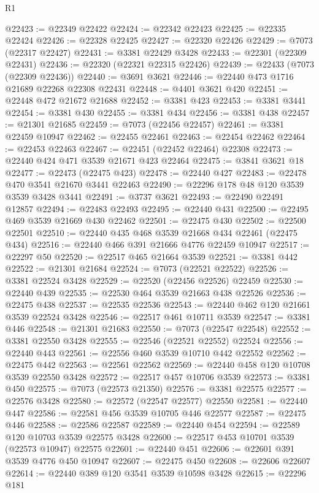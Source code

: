 \begin{lexlean}{R1}
\begin{coremodule}
@22423 := @22349 @22422
@22424 := @22342 @22423
@22425 := @22335 @22424
@22426 := @22328 @22425
@22427 := @22320 @22426
@22429 := @7073 (@22317 @22427)
@22431 := @3381 @22429 @3428
@22433 := @22301 (@22309 @22431)
@22436 := @22320 (@22321 @22315 @22426)
@22439 := @22433 (@7073 (@22309 @22436))
@22440 := @3691 @3621
@22446 := @22440 @473 @1716 @21689 @22268 @22308 @22431
@22448 := @4401 @3621 @420
@22451 := @22448 @472 @21672 @21688
@22452 := @3381 @423
@22453 := @3381 @3441
@22454 := @3381 @430
@22455 := @3381 @434
@22456 := @3381 @438
@22457 := @21301 @21685
@22459 := @7073 (@22456 @22457)
@22461 := @3381 @22459 @10947
@22462 := @22455 @22461
@22463 := @22454 @22462
@22464 := @22453 @22463
@22467 := @22451 (@22452 @22464) @22308
@22473 := @22440 @424 @471 @3539 @21671 @423 @22464
@22475 := @3841 @3621 @18
@22477 := @22473 (@22475 @423)
@22478 := @22440 @427
@22483 := @22478 @470 @3541 @21670 @3441 @22463
@22490 := @22296 @178 @48 @120 @3539 @3539 @3428 @3441
@22491 := @3737 @3621
@22493 := @22490 @22491 @12857
@22494 := @22483 @22493
@22495 := @22440 @431
@22500 := @22495 @469 @3539 @21669 @430 @22462
@22501 := @22475 @430
@22502 := @22500 @22501
@22510 := @22440 @435 @468 @3539 @21668 @434 @22461 (@22475 @434)
@22516 := @22440 @466 @391 @21666 @4776 @22459 @10947
@22517 := @22297 @50
@22520 := @22517 @465 @21664 @3539
@22521 := @3381 @442
@22522 := @21301 @21684
@22524 := @7073 (@22521 @22522)
@22526 := @3381 @22524 @3428
@22529 := @22520 (@22456 @22526) @22459
@22530 := @22440 @439
@22535 := @22530 @464 @3539 @21663 @438 @22526
@22536 := @22475 @438
@22537 := @22535 @22536
@22543 := @22440 @462 @120 @21661 @3539 @22524 @3428
@22546 := @22517 @461 @10711 @3539
@22547 := @3381 @446
@22548 := @21301 @21683
@22550 := @7073 (@22547 @22548)
@22552 := @3381 @22550 @3428
@22555 := @22546 (@22521 @22552) @22524
@22556 := @22440 @443
@22561 := @22556 @460 @3539 @10710 @442 @22552
@22562 := @22475 @442
@22563 := @22561 @22562
@22569 := @22440 @458 @120 @10708 @3539 @22550 @3428
@22572 := @22517 @457 @10706 @3539
@22573 := @3381 @450
@22575 := @7073 (@22573 @21350)
@22576 := @3381 @22575
@22577 := @22576 @3428
@22580 := @22572 (@22547 @22577) @22550
@22581 := @22440 @447
@22586 := @22581 @456 @3539 @10705 @446 @22577
@22587 := @22475 @446
@22588 := @22586 @22587
@22589 := @22440 @454
@22594 := @22589 @120 @10703 @3539 @22575 @3428
@22600 := @22517 @453 @10701 @3539 (@22573 @10947) @22575
@22601 := @22440 @451
@22606 := @22601 @391 @3539 @4776 @450 @10947
@22607 := @22475 @450
@22608 := @22606 @22607
@22614 := @22440 @389 @120 @3541 @3539 @10598 @3428
@22615 := @22296 @181

\end{coremodule}
\end{lexlean}

